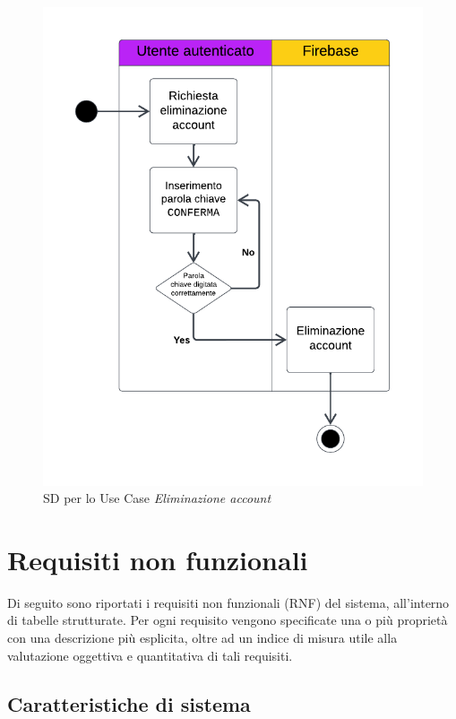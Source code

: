 \documentclass[11pt, a4paper]{article}
\theoremstyle{definition} %
\begin{document}
\begin{figure}[H]
\centering
\hspace*{-0.8cm}
\includegraphics[scale = 0.9]{materiale/ucdiagrams/swimlaneeliminaaccount.pdf}
\caption{SD per lo Use Case \textit{Eliminazione account}}
\label{deleteaccount}
\end{figure}

\newpage
\section{Requisiti non funzionali}
Di seguito sono riportati i requisiti non funzionali (RNF)
del sistema, all'interno di tabelle strutturate. Per ogni requisito vengono
specificate una o più proprietà con una descrizione più esplicita,
oltre ad un indice di misura utile alla valutazione oggettiva
e quantitativa di tali requisiti.

\subsection{Caratteristiche di sistema}
\end{document}
